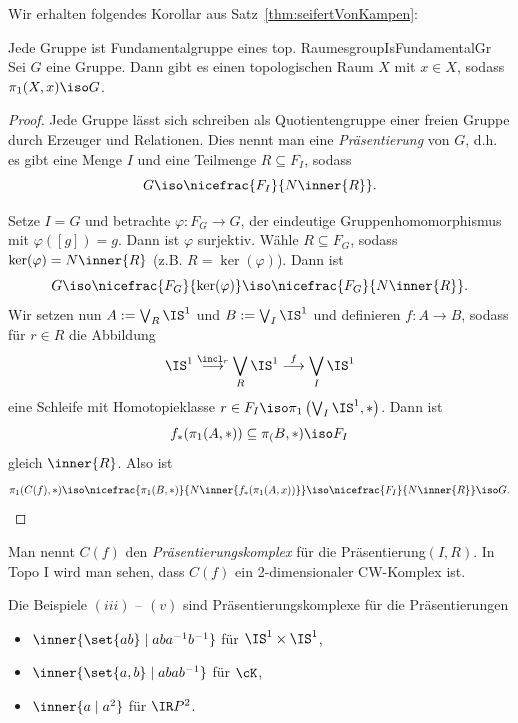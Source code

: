 \documentclass[language=ngerman]{TemplateLecture} %
\begin{document}
Wir erhalten folgendes Korollar aus Satz~\ref{thm:seifertVonKampen}:
\begin{thm}{Jede Gruppe ist Fundamentalgruppe eines top. Raumes}{groupIsFundamentalGr}
    Sei $G$ eine Gruppe. Dann gibt es einen topologischen Raum $X$ mit $x \in X$, sodass $\pi_1(X,x) \iso G$.
\end{thm}
\begin{proof}
    Jede Gruppe lässt sich schreiben als Quotientengruppe einer freien Gruppe durch Erzeuger und Relationen. Dies nennt man eine \emph{Präsentierung} von $G$, d.h. es gibt eine Menge $I$ und eine Teilmenge $R \subseteq F_I$, sodass
    \begin{equation*}
        G \iso \nicefrac{F_I}{N\inner{R}}.
    \end{equation*}
    
    Setze $I = G$ und betrachte $\varphi: F_G \to G$, der eindeutige Gruppenhomomorphismus mit $\varphi([g]) = g$. Dann ist $\varphi$ surjektiv. 
    Wähle $R \subseteq F_G$, sodass $\ker(\varphi) = N \inner{R}$ (z.B. $R = \ker(\varphi)$). Dann ist 
    \begin{equation*}
        G \iso \nicefrac{F_G}{\ker(\varphi)} \iso \nicefrac{F_G}{N\inner{R}}.
    \end{equation*}
    Wir setzen nun $A := \bigvee_R \IS^1$ und $B := \bigvee_I \IS^1$ und definieren $f: A \to B$, sodass für $r \in R$ die Abbildung
    \begin{equation*}
        \IS^1 \overset{\incl_r}{\longrightarrow} \bigvee_R \IS^1 \overset{f}{\longrightarrow} \bigvee_I \IS^1
    \end{equation*}
    eine Schleife mit Homotopieklasse $r \in F_I \iso \pi_1\left(\bigvee_I \IS^1, *\right)$. Dann ist 
    \begin{equation*}
        f_*(\pi_1(A, *)) \subseteq \pi_(B, *) \iso F_I
    \end{equation*}
    gleich $\inner{R}$. Also ist 
    \begin{equation*}
        \pi_1(C(f), *) \iso \nicefrac{\pi_1(B, *)}{N\inner{f_*(\pi_1(A,x))}} \iso \nicefrac{F_I}{N\inner{R}} \iso G. \qedhere
    \end{equation*}
\end{proof}

Man nennt $C(f)$ den \emph{Präsentierungskomplex} für die Präsentierung$(I,R)$. In Topo I wird man sehen, dass $C(f)$ ein 2-dimensionaler CW-Komplex ist.

\begin{remark}
    Die Beispiele $(iii)$ -- $(v)$ sind Präsentierungskomplexe für die Präsentierungen 
    \begin{itemize}
        \item $\inner{\set{ab} \mid a b a^{-1} b^{-1}}$ für $\IS^1 \times \IS^1$,
        \item $\inner{\set{a,b} \mid a b a b^{-1}}$ für $\cK$,
        \item $\inner{a \mid a^2}$ für $\IR P^2$.
    \end{itemize}
\end{remark}
\end{document}
